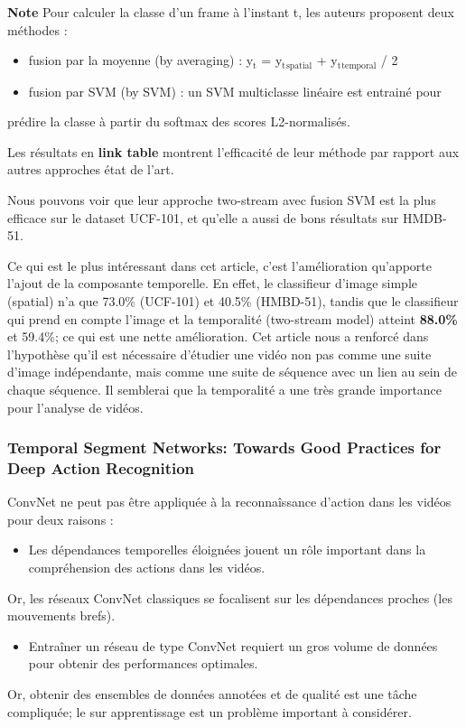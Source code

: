 \documentclass[11pt]{article}
\begin{document}
\begin{enumerate}
\textbf{Note} Pour calculer la classe d'un frame à l'instant t, les auteurs proposent
deux méthodes :
\begin{itemize}
\item fusion par la moyenne (by averaging) : y$_{\text{t}}$ = y$_{\text{t}}$$_{\text{spatial}}$ + y$_{\text{t}}$$_{\text{temporal}}$ / 2
\item fusion par SVM (by SVM) : un SVM multiclasse linéaire est entrainé pour
\end{itemize}
prédire la classe à partir du softmax des scores L2-normalisés.

Les résultats en \textbf{link table} montrent l'efficacité de leur méthode par rapport
aux autres approches état de l'art.

Nous pouvons voir que leur approche two-stream avec fusion SVM est la plus 
efficace sur le dataset UCF-101, et qu'elle a aussi de bons résultats sur
HMDB-51.

Ce qui est le plus intéressant dans cet article, c'est l'amélioration
qu'apporte l'ajout de la composante temporelle.
En effet, le classifieur d'image simple (spatial) n'a que 73.0\% (UCF-101) et 
40.5\% (HMBD-51), tandis que le classifieur qui prend en compte l'image et 
la temporalité (two-stream model) atteint \textbf{88.0\%} et 59.4\%; ce qui 
est une nette amélioration. Cet article nous a renforcé dans l'hypothèse
qu'il est nécessaire d'étudier une vidéo non pas comme une suite d'image 
indépendante, mais comme une suite de séquence avec un lien au sein de 
chaque séquence.
Il semblerai que la temporalité a une très grande importance pour 
l'analyse de vidéos.
\end{enumerate}

\subsubsection{Temporal Segment Networks: Towards Good Practices for Deep Action Recognition}
\label{sec-8-1-2}
ConvNet ne peut pas être appliquée à la reconnaîssance d'action dans les vidéos pour deux raisons :
\begin{itemize}
\item Les dépendances temporelles éloignées jouent un rôle important dans la compréhension des actions dans les vidéos.
\end{itemize}
Or, les réseaux ConvNet classiques se focalisent sur les dépendances proches (les mouvements brefs).
\begin{itemize}
\item Entraîner un réseau de type ConvNet requiert un gros volume de données pour obtenir des performances optimales.
\end{itemize}
Or, obtenir des ensembles de données annotées et de qualité est une tâche compliquée; le sur apprentissage est un
problème important à considérer.
\end{document}
